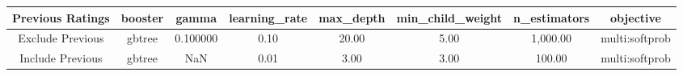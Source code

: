 \footnotesize
\begin{tabular}{cccccccc}
\toprule
Previous Ratings & booster & gamma & learning_rate & max_depth & min_child_weight & n_estimators & objective \\
\midrule
Exclude Previous & gbtree & 0.100000 & 0.10 & 20.00 & 5.00 & 1,000.00 & multi:softprob \\
Include Previous & gbtree & NaN & 0.01 & 3.00 & 3.00 & 100.00 & multi:softprob \\
\bottomrule
\end{tabular}

\normalsize